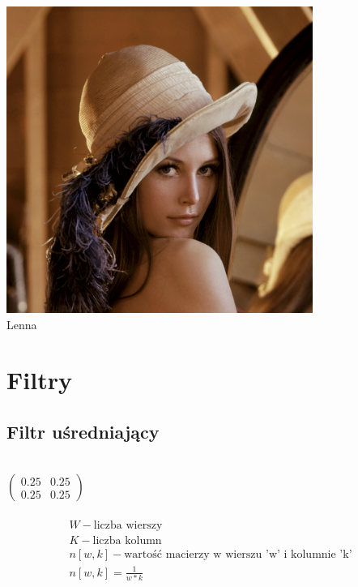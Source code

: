\documentclass[a4paper,12pt,openany]{report}
\begin{document}
\begin{center}
\includegraphics[width=10cm]{resources/Lena.jpg}\\
\tiny{Lenna}
\end{center}

\chapter{Filtry}

\section{Filtr uśredniający}
\\
\linebreak
$\begin{pmatrix}
0.25 & 0.25\\
0.25 & 0.25
\end{pmatrix}$
\\
\linebreak
{}
\\
\linebreak
\begin{gather*}
W - \text{liczba wierszy} \\
K - \text{liczba kolumn} \\
n[w, k] - \text{wartość macierzy w wierszu 'w' i kolumnie 'k'} \\
n[w, k] = \frac{1}{w*k}\\
\end{gather*}
\end{document}
